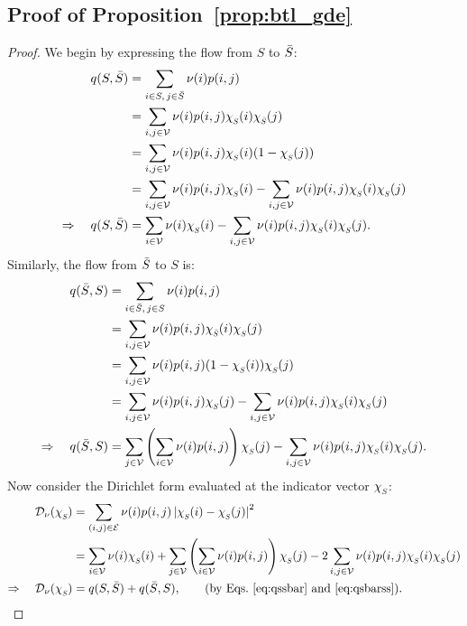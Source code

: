\documentclass[10pt]{article} %
\def\eqref#1{equation~\ref{#1}}
\def\gV{{\mathcal{V}}}
\newcommand{\q}{q}
\newcommand{\chivec}[1] {{\chi_{\raisebox{-0.15em}{\scalebox{0.6}{$#1$}}}}}
\renewcommand{\eqref}[1]{\ref{#1}}
\begin{document}
\subsection{Proof of Proposition~\ref{prop:btl_gde}}\label{proof:btlgde}
\begin{proof}
  We begin by expressing the flow from $ S $ to $ \Bar{S} $:
  \begin{align}
    \q(S,\Bar{S})
    &= \sum_{i \in S,\, j \in \Bar{S}} \nu(i) p(i,j) \nonumber \\
    &= \sum_{i,j \in \gV} \nu(i) p(i,j) \chivec{S}(i) \chivec{\Bar{S}}(j) \nonumber \\
    &= \sum_{i,j \in \gV} \nu(i) p(i,j) \chivec{S}(i) (1 - \chivec{S}(j)) \nonumber \\
    &= \sum_{i,j \in \gV} \nu(i) p(i,j) \chivec{S}(i)
      - \sum_{i,j \in \gV} \nu(i) p(i,j) \chivec{S}(i) \chivec{S}(j) \nonumber \\
    \Rightarrow \quad
    \q(S,\Bar{S})
    &= \sum_{i \in \gV} \nu(i) \chivec{S}(i)
      - \sum_{i,j \in \gV} \nu(i) p(i,j) \chivec{S}(i) \chivec{S}(j).
    \label{eq:qssbar}
  \end{align}
  Similarly, the flow from $ \Bar{S} $ to $ S $ is:
  \begin{align}
    \q(\Bar{S},S)
    &= \sum_{i \in \Bar{S},\, j \in S} \nu(i) p(i,j) \nonumber \\
    &= \sum_{i,j \in \gV} \nu(i) p(i,j) \chivec{\Bar{S}}(i) \chivec{S}(j) \nonumber \\
    &= \sum_{i,j \in \gV} \nu(i) p(i,j) (1 - \chivec{S}(i)) \chivec{S}(j) \nonumber \\
    &= \sum_{i,j \in \gV} \nu(i) p(i,j) \chivec{S}(j)
      - \sum_{i,j \in \gV} \nu(i) p(i,j) \chivec{S}(i) \chivec{S}(j) \nonumber \\
    \Rightarrow \quad
    \q(\Bar{S},S)
    &= \sum_{j \in \gV} \left( \sum_{i \in \gV} \nu(i) p(i,j) \right) \chivec{S}(j)
      - \sum_{i,j \in \gV} \nu(i) p(i,j) \chivec{S}(i) \chivec{S}(j).
    \label{eq:qsbarss}
  \end{align}
  Now consider the Dirichlet form evaluated at the indicator vector $ \chivec{S} $:
  \begin{align*}
    \mathcal{D}_{\nu}(\chivec{S})
    &= \sum_{(i,j) \in \mathcal{E}} \nu(i) p(i,j) \left| \chivec{S}(i) - \chivec{S}(j) \right|^2 \\
    &= \sum_{i \in \gV} \nu(i) \chivec{S}(i)
      + \sum_{j \in \gV} \left( \sum_{i \in \gV} \nu(i) p(i,j) \right) \chivec{S}(j)
      - 2 \sum_{i,j \in \gV} \nu(i) p(i,j) \chivec{S}(i) \chivec{S}(j) \\
    \Rightarrow \quad
    \mathcal{D}_{\nu}(\chivec{S})
    &= \q(S,\Bar{S}) + \q(\Bar{S},S),
    \qquad \text{(by Eqs.~\eqref{eq:qssbar} and~\eqref{eq:qsbarss})}.
  \end{align*}
\end{proof}
\end{document}
